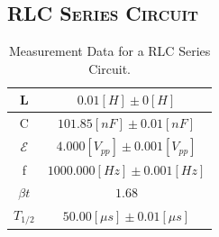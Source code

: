 \documentclass[a4paper,12pt]{article}
\begin{document}
\subsection{\textsc{RLC Series Circuit}}
\begin{table}[htbb]
\begin{center}
\begin{tabular}{|c|c|}
\hline
L & $0.01 [H] \pm 0 [H]$ \\ \hline
C & $ 101.85 [nF] \pm 0.01 [nF] $ \\ \hline
$\mathcal{E}$ & $ 4.000[V_{pp}] \pm 0.001[V_{pp}] $ \\ \hline
f & $ 1000.000 [Hz] \pm 0.001 [Hz] $ \\ \hline
$\beta t$ & $1.68$ \\ \hline
$T_{1/2}$ & $ 50.00[\mu s] \pm 0.01[\mu s] $ \\ \hline
\end{tabular}
\caption{Measurement Data for a RLC Series Circuit.}
\end{center}
\end{table}
\end{document}
